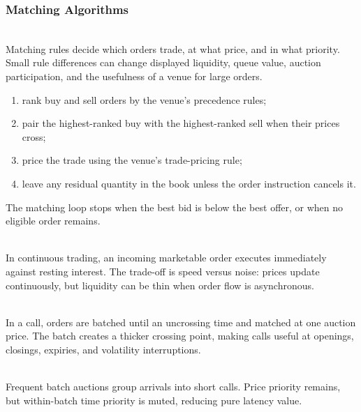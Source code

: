 \subsubsection{Matching Algorithms}

\begin{principle} \\
Matching rules decide which orders trade, at what price, and in what priority. Small rule differences can change displayed liquidity, queue value, auction participation, and the usefulness of a venue for large orders.
\end{principle}

\begin{process} 
\begin{enumerate}[label=\roman*.]
\setlength{\itemsep}{0pt}
\item rank buy and sell orders by the venue's precedence rules;
\item pair the highest-ranked buy with the highest-ranked sell when their prices cross;
\item price the trade using the venue's trade-pricing rule;
\item leave any residual quantity in the book unless the order instruction cancels it.
\end{enumerate}
The matching loop stops when the best bid is below the best offer, or when no eligible order remains.
\end{process}

\begin{mechanism} \\
In continuous trading, an incoming marketable order executes immediately against resting interest. The trade-off is speed versus noise: prices update continuously, but liquidity can be thin when order flow is asynchronous.
\end{mechanism}

\begin{mechanism} \\
In a call, orders are batched until an uncrossing time and matched at one auction price. The batch creates a thicker crossing point, making calls useful at openings, closings, expiries, and volatility interruptions.
\end{mechanism}

\begin{mechanism} \\
Frequent batch auctions group arrivals into short calls. Price priority remains, but within-batch time priority is muted, reducing pure latency value.
\end{mechanism}

